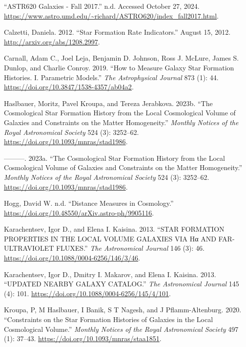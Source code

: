 \documentclass[
]{article}
\newlength{\cslhangindent}
\newenvironment{CSLReferences}[2] %
 {\begin{list}{}{%
  \setlength{\itemindent}{0pt}
  \setlength{\leftmargin}{0pt}
  \setlength{\parsep}{0pt}
  \ifodd #1
   \setlength{\leftmargin}{\cslhangindent}
   \setlength{\itemindent}{-1\cslhangindent}
  \fi
  \setlength{\itemsep}{#2\baselineskip}}}
 {\end{list}}
\begin{document}
\label{refs}
\begin{CSLReferences}{1}{0}
{``{ASTR620 Galaxies} - {Fall} 2017.''} n.d. Accessed October 27, 2024.
\url{https://www.astro.umd.edu/~richard/ASTRO620/index_fall2017.html}.

Calzetti, Daniela. 2012. {``Star {Formation Rate Indicators}.''} August
15, 2012. \url{http://arxiv.org/abs/1208.2997}.

Carnall, Adam C., Joel Leja, Benjamin D. Johnson, Ross J. McLure, James
S. Dunlop, and Charlie Conroy. 2019. {``How to {Measure Galaxy Star
Formation Histories}. {I}. {Parametric Models}.''} \emph{The
Astrophysical Journal} 873 (1): 44.
\url{https://doi.org/10.3847/1538-4357/ab04a2}.

Haslbauer, Moritz, Pavel Kroupa, and Tereza Jerabkova. 2023b. {``The
Cosmological Star Formation History from the {Local Cosmological Volume}
of Galaxies and Constraints on the Matter Homogeneity.''} \emph{Monthly
Notices of the Royal Astronomical Society} 524 (3): 3252--62.
\url{https://doi.org/10.1093/mnras/stad1986}.

---------. 2023a. {``The Cosmological Star Formation History from the
Local Cosmological Volume of Galaxies and Constraints on the Matter
Homogeneity.''} \emph{Monthly Notices of the Royal Astronomical Society}
524 (3): 3252--62. \url{https://doi.org/10.1093/mnras/stad1986}.

Hogg, David W. n.d. {``Distance Measures in Cosmology.''}
\url{https://doi.org/10.48550/arXiv.astro-ph/9905116}.

Karachentsev, Igor D., and Elena I. Kaisina. 2013. {``{STAR FORMATION
PROPERTIES IN THE LOCAL VOLUME GALAXIES VIA Hα AND FAR-ULTRAVIOLET
FLUXES}.''} \emph{The Astronomical Journal} 146 (3): 46.
\url{https://doi.org/10.1088/0004-6256/146/3/46}.

Karachentsev, Igor D., Dmitry I. Makarov, and Elena I. Kaisina. 2013.
{``UPDATED NEARBY GALAXY CATALOG.''} \emph{The Astronomical Journal} 145
(4): 101. \url{https://doi.org/10.1088/0004-6256/145/4/101}.

Kroupa, P, M Haslbauer, I Banik, S T Nagesh, and J Pflamm-Altenburg.
2020. {``Constraints on the Star Formation Histories of Galaxies in the
{Local Cosmological Volume}.''} \emph{Monthly Notices of the Royal
Astronomical Society} 497 (1): 37--43.
\url{https://doi.org/10.1093/mnras/staa1851}.


\end{CSLReferences}
\end{document}
